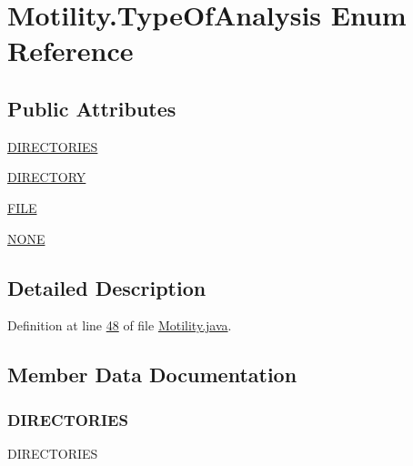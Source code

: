 \hypertarget{enumanalysis_1_1_motility_1_1_type_of_analysis}{}\section{Motility.\+Type\+Of\+Analysis Enum Reference}
\label{enumanalysis_1_1_motility_1_1_type_of_analysis}
\subsection*{Public Attributes}
\begin{DoxyCompactItemize}
\item 
\hyperlink{enumanalysis_1_1_motility_1_1_type_of_analysis_afbd1f04e1781e8136dee40ac5096959c}{D\+I\+R\+E\+C\+T\+O\+R\+I\+ES}
\item 
\hyperlink{enumanalysis_1_1_motility_1_1_type_of_analysis_ace72c1d90b5a48ebbddd2be5b5f9368f}{D\+I\+R\+E\+C\+T\+O\+RY}
\item 
\hyperlink{enumanalysis_1_1_motility_1_1_type_of_analysis_a49ca3d2aae1b4847965178deb5633261}{F\+I\+LE}
\item 
\hyperlink{enumanalysis_1_1_motility_1_1_type_of_analysis_a899caa602e4fff675b17cdbab33607ec}{N\+O\+NE}
\end{DoxyCompactItemize}


\subsection{Detailed Description}


Definition at line \hyperlink{_motility_8java_source_l00048}{48} of file \hyperlink{_motility_8java_source}{Motility.\+java}.



\subsection{Member Data Documentation}
\hypertarget{enumanalysis_1_1_motility_1_1_type_of_analysis_afbd1f04e1781e8136dee40ac5096959c}{}\label{enumanalysis_1_1_motility_1_1_type_of_analysis_afbd1f04e1781e8136dee40ac5096959c} 
\subsubsection{\texorpdfstring{D\+I\+R\+E\+C\+T\+O\+R\+I\+ES}{DIRECTORIES}}
{\footnotesize\ttfamily D\+I\+R\+E\+C\+T\+O\+R\+I\+ES}



